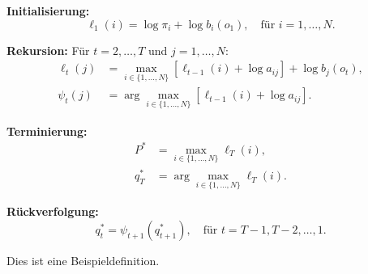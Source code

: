 \textbf{Initialisierung:}
\begin{equation}
  \ell_1(i) = \log \pi_i + \log b_i(o_1), \quad \text{für } i = 1, \ldots, N.
\end{equation}

\textbf{Rekursion:}
Für $t = 2, \ldots, T$ und $j = 1, \ldots, N$:
\begin{align}
  \ell_t(j) &= \max_{i \in \{1, \ldots, N\}} [\ell_{t-1}(i) + \log a_{ij}] + \log b_j(o_t), \\
  \psi_t(j) &= \arg\max_{i \in \{1, \ldots, N\}} [\ell_{t-1}(i) + \log a_{ij}].
\end{align}

\textbf{Terminierung:}
\begin{align}
  P^* &= \max_{i \in \{1, \ldots, N\}} \ell_T(i), \\
  q_T^* &= \arg\max_{i \in \{1, \ldots, N\}} \ell_T(i).
\end{align}

\textbf{Rückverfolgung:}
\begin{equation}
  q_t^* = \psi_{t+1}(q_{t+1}^*), \quad \text{für } t = T-1, T-2, \ldots, 1.
\end{equation}

\begin{definition}[Beispieldefinition]
Dies ist eine Beispieldefinition.
\end{definition}

